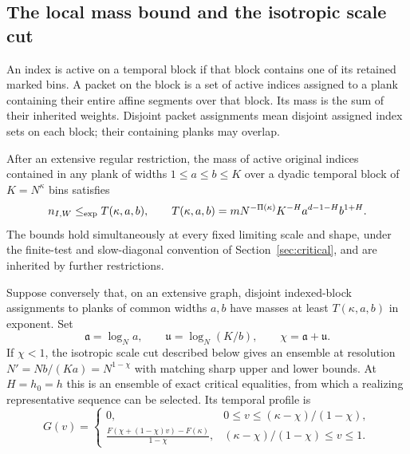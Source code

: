 \subsection{The local mass bound and the isotropic scale cut}

An index is active on a temporal block if that block contains one
of its retained marked bins.  A packet on the block is a set of
active indices assigned to a plank containing their entire affine
segments over that block.  Its mass is the sum of their inherited
weights.  Disjoint packet assignments mean disjoint assigned index
sets on each block; their containing planks may overlap.

\begin{proposition}
\label{prop:local-bound}
After an extensive regular restriction, the mass of active original
indices contained in any plank of widths $1\leq a\leq b\leq K$ over
a dyadic temporal block of $K=N^\kappa$ bins satisfies
\begin{equation}
 n_{I,W}\mathrel{\leq_{\mathrm{exp}}} T(\kappa,a,b),\qquad
 T(\kappa,a,b)=
 mN^{-\Pi(\kappa)}K^{-H}a^{d-1-H}b^{1+H}.
 \label{loc:mass-bound}
\end{equation}
The bounds hold simultaneously at every fixed limiting scale and
shape, under the finite-test and slow-diagonal convention of
Section~\ref{sec:critical}, and are inherited by further restrictions.

Suppose conversely that, on an extensive graph, disjoint indexed-block
assignments to planks of common widths $a,b$ have masses at least
$T(\kappa,a,b)$ in exponent.  Set
\begin{equation}
 \mathfrak a=\log_N a,
 \qquad \mathfrak u=\log_N(K/b),
 \qquad \chi=\mathfrak a+\mathfrak u.
 \label{loc:cut-loss}
\end{equation}
If $\chi<1$, the isotropic scale cut described below gives an ensemble
at resolution $N'=Nb/(Ka)=N^{1-\chi}$ with matching sharp upper and
lower bounds.  At $H=h_0=h$ this is an ensemble of exact critical
equalities, from which a realizing representative sequence can be
selected.  Its temporal profile is
\begin{equation}
 G(v)=
 \begin{cases}
  0,&0\leq v\leq(\kappa-\chi)/(1-\chi),\\[2pt]
  \displaystyle
  \frac{F(\chi+(1-\chi)v)-F(\kappa)}{1-\chi},
     &(\kappa-\chi)/(1-\chi)\leq v\leq1.
 \end{cases}
 \label{loc:cut-profile}
\end{equation}
\end{proposition}

